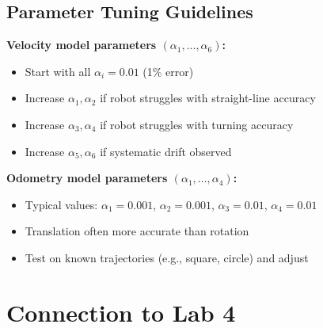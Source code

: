 \subsection{Parameter Tuning Guidelines}

\textbf{Velocity model parameters $(\alpha_1, \ldots, \alpha_6)$:}
\begin{itemize}
    \item Start with all $\alpha_i = 0.01$ (1\% error)
    \item Increase $\alpha_1, \alpha_2$ if robot struggles with straight-line accuracy
    \item Increase $\alpha_3, \alpha_4$ if robot struggles with turning accuracy
    \item Increase $\alpha_5, \alpha_6$ if systematic drift observed
\end{itemize}

\textbf{Odometry model parameters $(\alpha_1, \ldots, \alpha_4)$:}
\begin{itemize}
    \item Typical values: $\alpha_1 = 0.001$, $\alpha_2 = 0.001$, $\alpha_3 = 0.01$, $\alpha_4 = 0.01$
    \item Translation often more accurate than rotation
    \item Test on known trajectories (e.g., square, circle) and adjust
\end{itemize}

\section{Connection to Lab 4}

